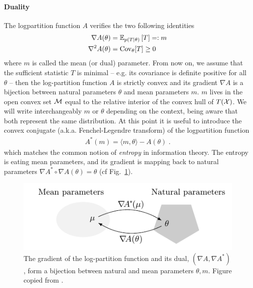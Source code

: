 \documentclass[twoside]{article}
\newcommand*{\expect}[2][]{\ensuremath{\mathbb{E}_{#1} \left[ #2 \right] }} %
\newcommand{\logpart}{A}
\newcommand{\conj}{\logpart^*}
\newcommand{\nat}{\theta}
\newcommand{\m}{m}
\newcommand{\meanp}{\m}
\begin{document}
\paragraph{Duality}
The logpartition function $\logpart$ verifies the two following identities
\begin{align}
    \nabla\logpart(\nat) &=  \expect[p(T|\nat)]{T} =: \meanp \\
    \nabla^2 \logpart(\nat) &= \Cov_\nat[T] \geq 0
\end{align}
where $\meanp$ is called the mean (or dual) parameter.
From now on, we assume that the sufficient statistic $T$ is minimal
-- e.g. its covariance is definite positive for all $\nat$ --
then the log-partition function $\logpart$ is strictly convex and its gradient $\nabla \logpart$ is a bijection between natural parameters $\nat$ and mean parameters $\m$.
$\meanp$ lives in the open convex set ${\mathcal M}$ equal to the relative interior of the convex hull of $T({\mathcal X})$.
We will write interchangeably $\m$ or  $\nat$ depending on the context, being aware that both represent the same distribution.
At this point it is useful to introduce the convex conjugate (a.k.a. Fenchel-Legendre transform) of the logpartition function
\begin{align}
	\conj(\m) = \langle \m, \nat \rangle - \logpart(\nat) \; .
\end{align}
which matches the common notion of \textit{entropy} in information theory.
The entropy is eating mean parameters, and its gradient is mapping back to natural parameters $\nabla\conj \circ \nabla\logpart(\nat) = \nat$ (cf Fig.~\ref{fig:duality}).

\begin{figure}[ht]
	\centering
	\includegraphics{duality}
	\caption{The gradient of the log-partition function and its dual, $(\nabla \logpart, \nabla \conj)$, form a bijection between natural and mean parameters $\nat, \meanp$. Figure copied from \citet{kunstner2020homeomorphic}. %
	}
	\label{fig:duality}
\end{figure}
\end{document}
